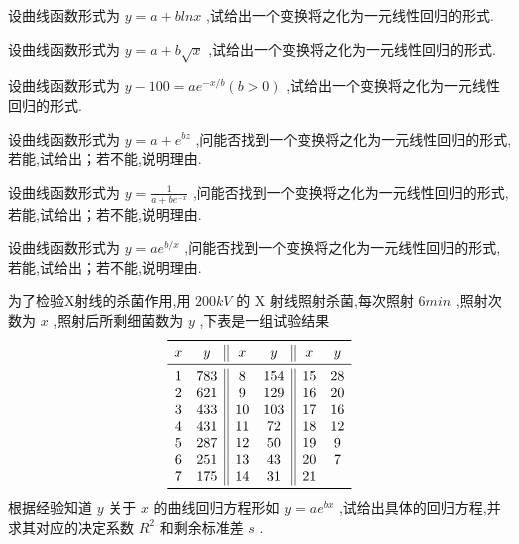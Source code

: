 \begin{xiti}
	\item 设曲线函数形式为 $ y=a+blnx $ ,试给出一个变换将之化为一元线性回归的形式.
	\item 设曲线函数形式为 $ y=a+b\sqrt{x} $ ,试给出一个变换将之化为一元线性回归的形式.
	\item 设曲线函数形式为 $ y-100=ae^{-x/b}(b>0) $ ,试给出一个变换将之化为一元线性回归的形式.
	\item 设曲线函数形式为 $ y=a+e^{bz} $ ,问能否找到一个变换将之化为一元线性回归的形式,若能,试给出；若不能,说明理由.
	\item 设曲线函数形式为 $ y=\frac{1}{a+be^{-x}} $ ,问能否找到一个变换将之化为一元线性回归的形式,若能,试给出；若不能,说明理由.
	\item 设曲线函数形式为 $ y=ae^{b/x} $ ,问能否找到一个变换将之化为一元线性回归的形式,若能,试给出；若不能,说明理由.
	\item 为了检验X射线的杀菌作用,用 $ 200kV $ 的 X 射线照射杀菌,每次照射 $ 6min $ ,照射次数为 $ x $ ,照射后所剩细菌数为 $ y $ ,下表是一组试验结果
	\[
	\begin{array}{cc||cc||cc}
	\toprule
	x     & y     & x     & y     & x     & y \\\midrule
	1     & 783   & 8     & 154   & 15    & 28 \\
	2     & 621   & 9     & 129   & 16    & 20 \\
	3     & 433   & 10    & 103   & 17    & 16 \\
	4     & 431   & 11    & 72    & 18    & 12 \\
	5     & 287   & 12    & 50    & 19    & 9 \\
	6     & 251   & 13    & 43    & 20    & 7 \\
	7     & 175   & 14    & 31    & 21    &  \\\bottomrule
	\end{array}%
	\]
	根据经验知道 $ y $ 关于 $ x $ 的曲线回归方程形如 $ y=ae^{bx} $ ,试给出具体的回归方程,并求其对应的决定系数 $ R^2 $ 和剩余标准差 $ s $ .
\end{xiti}